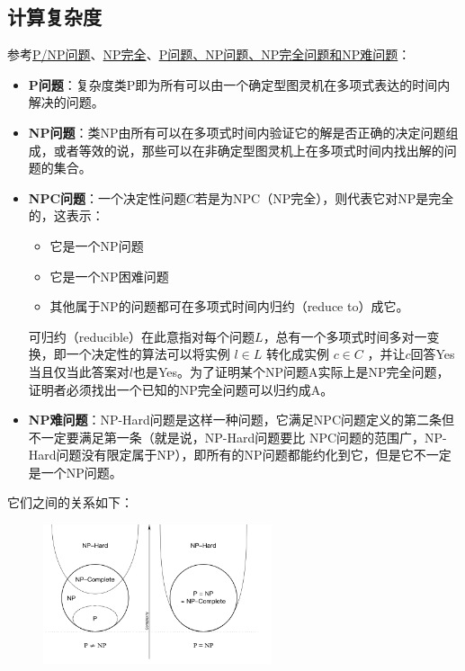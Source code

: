 \documentclass[10pt]{ctexart}
\begin{document}
\subsection{计算复杂度}
参考\href{https://zh.wikipedia.org/wiki/P/NP%E9%97%AE%E9%A2%98}{P/NP问题}、\href{https://zh.wikipedia.org/wiki/NP%E5%AE%8C%E5%85%A8}{NP完全}、\href{https://zhuanlan.zhihu.com/p/73953567}{P问题、NP问题、NP完全问题和NP难问题}：
\begin{itemize}
	\item \textbf{P问题}：复杂度类P即为所有可以由一个确定型图灵机在多项式表达的时间内解决的问题。
	\item \textbf{NP问题}：类NP由所有可以在多项式时间内验证它的解是否正确的决定问题组成，或者等效的说，那些可以在非确定型图灵机上在多项式时间内找出解的问题的集合。
	\item \textbf{NPC问题}：一个决定性问题$C$若是为NPC（NP完全），则代表它对NP是完全的，这表示：
	\begin{itemize}
		\item 它是一个NP问题
		\item 它是一个NP困难问题
		\item 其他属于NP的问题都可在多项式时间内归约（reduce to）成它。
	\end{itemize}
	可归约（reducible）在此意指对每个问题$L$，总有一个多项式时间多对一变换，即一个决定性的算法可以将实例 $l \in L$ 转化成实例 $c \in C$ ，并让$c$回答Yes当且仅当此答案对$l$也是Yes。为了证明某个NP问题A实际上是NP完全问题，证明者必须找出一个已知的NP完全问题可以归约成A。

	\item \textbf{NP难问题}：NP-Hard问题是这样一种问题，它满足NPC问题定义的第二条但不一定要满足第一条（就是说，NP-Hard问题要比 NPC问题的范围广，NP-Hard问题没有限定属于NP），即所有的NP问题都能约化到它，但是它不一定是一个NP问题。
\end{itemize}
它们之间的关系如下：
\begin{figure}[H]
    \centering
    \includegraphics[width=0.6\textwidth]{./img/p_np_npc_nph.png} 
\end{figure}
\end{document}
